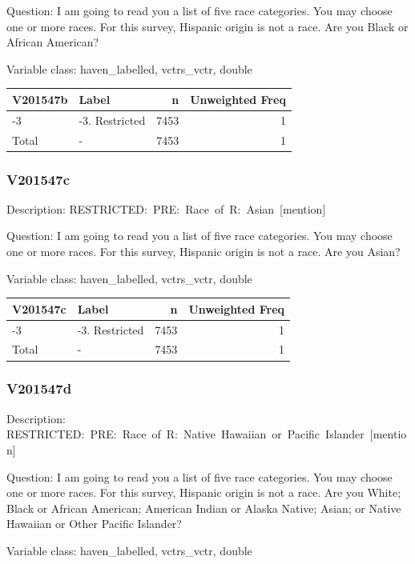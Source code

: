 \documentclass[
]{krantz}
\begin{document}
Question: I am going to read you a list of five race categories. You may choose one or more races. For this survey, Hispanic origin is not a race. Are you Black or African American?

Variable class: haven\_labelled, vctrs\_vctr, double

\begin{tabular}[t]{l|l|r|r}
\hline
V201547b & Label & n & Unweighted Freq\\
\hline
-3 & -3. Restricted & 7453 & 1\\
\hline
Total & - & 7453 & 1\\
\hline
\end{tabular}

\hypertarget{v201547c}{%
\subsubsection*{V201547c}\label{v201547c}}


Description: RESTRICTED:~PRE:~Race~of~R:~Asian~{[}mention{]}

Question: I am going to read you a list of five race categories. You may choose one or more races. For this survey, Hispanic origin is not a race. Are you Asian?

Variable class: haven\_labelled, vctrs\_vctr, double

\begin{tabular}[t]{l|l|r|r}
\hline
V201547c & Label & n & Unweighted Freq\\
\hline
-3 & -3. Restricted & 7453 & 1\\
\hline
Total & - & 7453 & 1\\
\hline
\end{tabular}

\hypertarget{v201547d}{%
\subsubsection*{V201547d}\label{v201547d}}


Description: RESTRICTED:~PRE:~Race~of~R:~Native~Hawaiian~or~Pacific~Islander~{[}mention{]}

Question: I am going to read you a list of five race categories. You may choose one or more races. For this survey, Hispanic origin is not a race. Are you White; Black or African American; American Indian or Alaska Native; Asian; or Native Hawaiian or Other Pacific Islander?

Variable class: haven\_labelled, vctrs\_vctr, double
\end{document}
